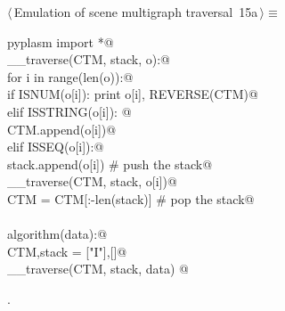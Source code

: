 \documentclass[11pt,oneside]{article}	%
\begin{document}
\begin{flushleft} \small \label{scrap28}
\protect{}$\langle\,$Emulation of scene multigraph traversal\nobreak\ {\footnotesize 15a}$\,\rangle\equiv$
\vspace{-1ex}
\begin{list}{}{} \item
\mbox{}\verb@from pyplasm import *@\\
\mbox{}\verb@def __traverse(CTM, stack, o):@\\
\mbox{}\verb@    for i in range(len(o)):@\\
\mbox{}\verb@        if ISNUM(o[i]): print o[i], REVERSE(CTM)@\\
\mbox{}\verb@        elif ISSTRING(o[i]): @\\
\mbox{}\verb@            CTM.append(o[i])@\\
\mbox{}\verb@        elif ISSEQ(o[i]):@\\
\mbox{}\verb@            stack.append(o[i])            # push the stack@\\
\mbox{}\verb@            __traverse(CTM, stack, o[i])@\\
\mbox{}\verb@            CTM = CTM[:-len(stack)]       # pop the stack@\\
\mbox{}\verb@@\\
\mbox{}\verb@def algorithm(data):@\\
\mbox{}\verb@    CTM,stack = ["I"],[]@\\
\mbox{}\verb@    __traverse(CTM, stack, data)  @\\
\mbox{}\verb@@{\NWsep}
\end{list}
\vspace{-1ex}
\footnotesize\addtolength{\baselineskip}{-1ex}
\begin{list}{}{\setlength{\itemsep}{-\parsep}\setlength{\itemindent}{-\leftmargin}}
\item {\NWtxtMacroNoRef}.
\end{list}
\end{flushleft}
\end{document}
